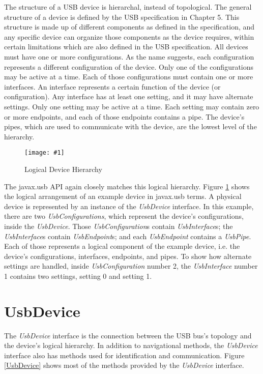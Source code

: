 \documentclass{article}
\newcommand{\myinterface}[1]{\emph{#1}}
\newcommand{\mysectionend}[0]{\vfill\pagebreak[1]}
\newcommand{\myfigure}[3]{\begin{figure}[htbp]\centering\texttt{[image: \#1]}\caption{#2}\label{#3}\end{figure}}
\begin{document}
The structure of a USB device is hierarchal, instead of topological.  The general
structure of a device is defined by the USB specification in Chapter 5.
This structure is made up of different components as defined in the specification,
and any specific device can organize those components as the device requires,
within certain limitations which are also defined in the USB specification.
All devices must have one or more configurations.  As the name suggests,
each configuration represents a different configuration of the device.
Only one of the configurations may be active at a time.  Each of those configurations
must contain one or more interfaces.  An interface represents a certain function
of the device (or configuration).  Any interface has at least one setting,
and it may have alternate settings.  Only one setting may be active at a time.
Each setting may contain zero or more endpoints, and each of those endpoints
contains a pipe.  The device's pipes, which are used to communicate with the
device, are the lowest level of the hierarchy.

\myfigure{figs/logical_device_hierarchy}{Logical Device Hierarchy}{device_hierarchy}

The javax.usb API again closely matches this logical hierarchy.  Figure \ref{device_hierarchy}
shows the logical arrangement of an example device in javax.usb terms.  A physical
device is represented by an instance of the \myinterface{UsbDevice} interface.  In this example,
there are two \myinterface{UsbConfigurations}, which represent the device's configurations,
inside the \myinterface{UsbDevice}.  Those \myinterface{UsbConfiguration}s
contain \myinterface{UsbInterface}s; the \myinterface{UsbInterface}s
contain \myinterface{UsbEndpoint}s; and each \myinterface{UsbEndpoint}
contains a \myinterface{UsbPipe}.  Each of those represents a logical component
of the example device, i.e. the device's configurations, interfaces, endpoints,
and pipes.  To show how alternate settings are handled, inside \myinterface{UsbConfiguration}
number 2, the \myinterface{UsbInterface} number 1 contains two settings, setting 0 and setting 1.

\mysectionend

%

\section{UsbDevice}

The \myinterface{UsbDevice} interface is the connection between the USB bus's
topology and the device's logical hierarchy.  In addition to
navigational methods, the \myinterface{UsbDevice} interface also has methods
used for identification and communication.  Figure \ref{UsbDevice}
shows most of the methods provided by the \myinterface{UsbDevice} interface.
\end{document}
